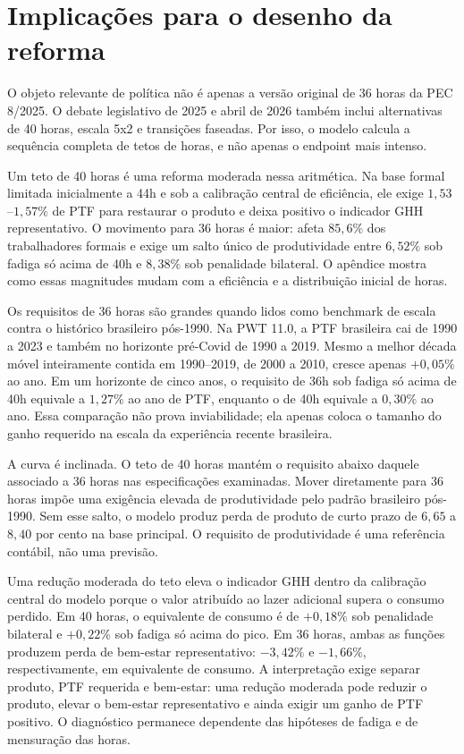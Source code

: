 \section{Implicações para o desenho da reforma}\label{sec:policy}

O objeto relevante de política não é apenas a versão original de 36 horas da PEC 8/2025. O debate legislativo de 2025 e abril de 2026 também inclui alternativas de 40 horas, escala 5x2 e transições faseadas. Por isso, o modelo calcula a sequência completa de tetos de horas, e não apenas o endpoint mais intenso.

Um teto de 40 horas é uma reforma moderada nessa aritmética. Na base formal limitada inicialmente a 44h e sob a calibração central de eficiência, ele exige $1{,}53$--$1{,}57\%$ de PTF para restaurar o produto e deixa positivo o indicador GHH representativo. O movimento para 36 horas é maior: afeta $85{,}6\%$ dos trabalhadores formais e exige um salto único de produtividade entre $6{,}52\%$ sob fadiga só acima de 40h e $8{,}38\%$ sob penalidade bilateral. O apêndice mostra como essas magnitudes mudam com a eficiência e a distribuição inicial de horas.

Os requisitos de 36 horas são grandes quando lidos como benchmark de escala contra o histórico brasileiro pós-1990. Na PWT 11.0, a PTF brasileira cai de 1990 a 2023 e também no horizonte pré-Covid de 1990 a 2019. Mesmo a melhor década móvel inteiramente contida em 1990--2019, de 2000 a 2010, cresce apenas $+0{,}05\%$ ao ano. Em um horizonte de cinco anos, o requisito de 36h sob fadiga só acima de 40h equivale a $1{,}27\%$ ao ano de PTF, enquanto o de 40h equivale a $0{,}30\%$ ao ano. Essa comparação não prova inviabilidade; ela apenas coloca o tamanho do ganho requerido na escala da experiência recente brasileira.

A curva é inclinada. O teto de 40 horas mantém o requisito abaixo daquele associado a 36 horas nas especificações examinadas. Mover diretamente para 36 horas impõe uma exigência elevada de produtividade pelo padrão brasileiro pós-1990. Sem esse salto, o modelo produz perda de produto de curto prazo de $6{,}65$ a $8{,}40$ por cento na base principal. O requisito de produtividade é uma referência contábil, não uma previsão.

Uma redução moderada do teto eleva o indicador GHH dentro da calibração central do modelo porque o valor atribuído ao lazer adicional supera o consumo perdido. Em 40 horas, o equivalente de consumo é de $+0{,}18\%$ sob penalidade bilateral e $+0{,}22\%$ sob fadiga só acima do pico. Em 36 horas, ambas as funções produzem perda de bem-estar representativo: $-3{,}42\%$ e $-1{,}66\%$, respectivamente, em equivalente de consumo. A interpretação exige separar produto, PTF requerida e bem-estar: uma redução moderada pode reduzir o produto, elevar o bem-estar representativo e ainda exigir um ganho de PTF positivo. O diagnóstico permanece dependente das hipóteses de fadiga e de mensuração das horas.

